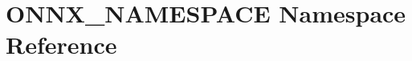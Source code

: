 \hypertarget{namespaceONNX__NAMESPACE}{}\section{O\+N\+N\+X\+\_\+\+N\+A\+M\+E\+S\+P\+A\+CE Namespace Reference}
\label{namespaceONNX__NAMESPACE}
